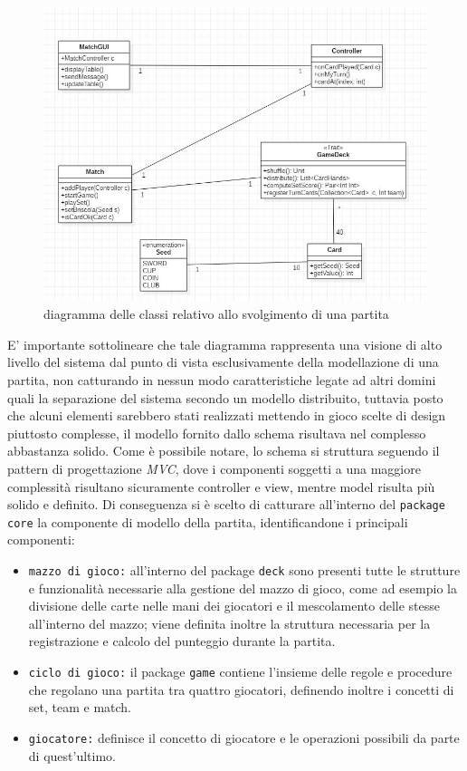 \begin{figure}[htbp]
  \includegraphics[width=\textwidth,height=\textheight,keepaspectratio]{initialArchitecture}
   \caption{diagramma delle classi relativo allo svolgimento di una partita}
\end{figure}

 E' importante sottolineare che tale diagramma rappresenta una visione di alto livello del sistema dal punto di vista esclusivamente della modellazione di una partita, non catturando in nessun modo caratteristiche legate ad altri domini quali la separazione del sistema secondo un modello distribuito, tuttavia posto che alcuni elementi sarebbero stati realizzati mettendo in gioco scelte di design piuttosto complesse, il modello fornito dallo schema risultava nel complesso abbastanza solido.
 Come è possibile notare, lo schema si struttura seguendo il pattern di progettazione \textit{MVC}, dove i componenti soggetti a una maggiore complessità risultano sicuramente controller e view, mentre model risulta più solido e definito.
 Di conseguenza si è scelto di catturare all'interno del \texttt{package core} la componente di modello della partita, identificandone i principali componenti:

\begin{itemize}
  \item{\texttt{mazzo di gioco:}} all'interno del package \texttt{deck} sono presenti tutte le strutture e funzionalità necessarie alla gestione del mazzo di gioco, come ad esempio la divisione delle carte nelle mani dei giocatori e il mescolamento delle stesse all'interno del mazzo; viene definita inoltre la struttura necessaria per la registrazione e calcolo del punteggio durante la partita.


  \item{\texttt{ciclo di gioco:}} il package \texttt{game} contiene l'insieme delle regole e procedure che regolano una partita tra quattro giocatori, definendo inoltre i concetti di set, team e match.

  \item{\texttt{giocatore:}} definisce il concetto di giocatore e le operazioni possibili da parte di quest'ultimo.

\end{itemize}

